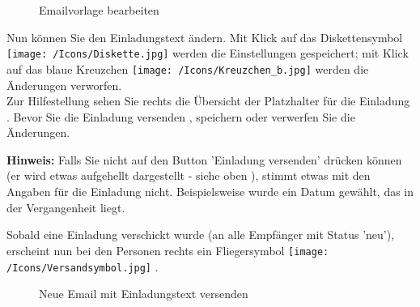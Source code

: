 \begin{figure}[H]
\caption{Emailvorlage bearbeiten}
\end{figure}

Nun können Sie den Einladungstext  ändern. Mit Klick auf das Diskettensymbol \texttt{[image: /Icons/Diskette.jpg]}  werden die Einstellungen gespeichert; mit Klick auf das blaue Kreuzchen \texttt{[image: /Icons/Kreuzchen\_b.jpg]}  werden die Änderungen verworfen.\\
Zur Hilfestellung sehen Sie rechts die Übersicht der Platzhalter für die Einladung . Bevor Sie die Einladung versenden , speichern  oder verwerfen  Sie die Änderungen.

\vspace{\baselineskip}

\textbf{Hinweis:} Falls Sie nicht auf den Button 'Einladung versenden' drücken können (er wird etwas aufgehellt dargestellt - siehe oben ), stimmt etwas mit den Angaben für die Einladung nicht. Beispielsweise wurde ein Datum gewählt, das in der Vergangenheit liegt.

\vspace{\baselineskip}

Sobald eine Einladung verschickt wurde (an alle Empfänger mit Status 'neu'), erscheint nun bei den Personen rechts ein Fliegersymbol \texttt{[image: /Icons/Versandsymbol.jpg]} .

\begin{figure}[H]
\caption{Neue Email mit Einladungstext versenden}
\end{figure}

